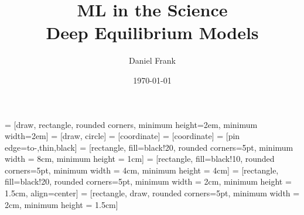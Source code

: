 \documentclass[8pt, t,
aspectratio=169,%
]{beamer}
\title[DEQ]{ML in the Science \\ Deep Equilibrium Models}
\author[]{Daniel Frank}
\institute[Analytic Computing]{Institute for Parallel and Distributed Systems}
\date{\today}
\begin{document}
 = [draw, rectangle, rounded corners, minimum height=2em, minimum width=2em]
 = [draw, circle]
 = [coordinate]
 = [coordinate]
 = [pin edge={to-,thin,black}]
 = [rectangle, fill=black!20, rounded corners=5pt, minimum width = 8cm, minimum height = 1cm]
 = [rectangle, fill=black!10, rounded corners=5pt, minimum width = 4cm, minimum height = 4cm]
 = [rectangle, fill=black!20, rounded corners=5pt, minimum width = 2cm, minimum height = 1.5cm, align=center]
 = [rectangle, draw, rounded corners=5pt, minimum width = 2cm, minimum height = 1.5cm]

\begin{frame}[plain]
  \titlepage
\end{frame}

\end{document}
